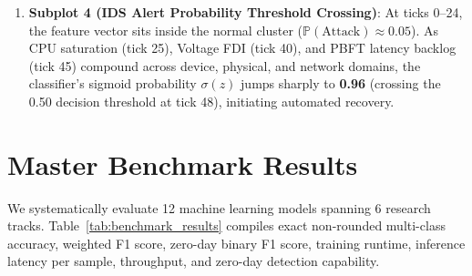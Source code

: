 \documentclass[conference]{IEEEtran}
\begin{document}
\begin{enumerate}
    \item \textbf{Subplot 4 (IDS Alert Probability Threshold Crossing)}: At ticks 0--24, the feature vector sits inside the normal cluster ($\mathbb{P}(\text{Attack}) \approx 0.05$). As CPU saturation (tick 25), Voltage FDI (tick 40), and PBFT latency backlog (tick 45) compound across device, physical, and network domains, the classifier's sigmoid probability $\sigma(z)$ jumps sharply to \textbf{0.96} (crossing the 0.50 decision threshold at tick 48), initiating automated recovery.
\end{enumerate}

\section{Master Benchmark Results}
\label{sec:benchmark_results}

We systematically evaluate 12 machine learning models spanning 6 research tracks. Table~\ref{tab:benchmark_results} compiles exact non-rounded multi-class accuracy, weighted F1 score, zero-day binary F1 score, training runtime, inference latency per sample, throughput, and zero-day detection capability.
\end{document}
